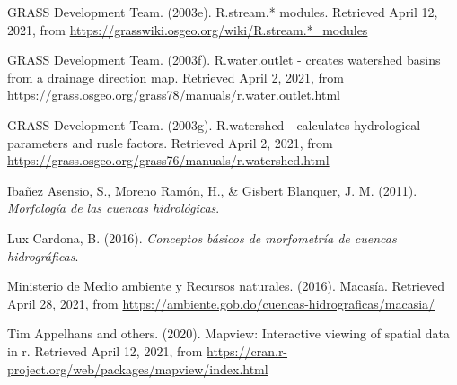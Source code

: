 \documentclass[11pt,]{article}
\begin{document}
\hypertarget{ref-addonrstream}{}
GRASS Development Team. (2003e). R.stream.* modules. Retrieved April 12,
2021, from \url{https://grasswiki.osgeo.org/wiki/R.stream.*_modules}

\hypertarget{ref-addonrwateroutlet}{}
GRASS Development Team. (2003f). R.water.outlet - creates watershed
basins from a drainage direction map. Retrieved April 2, 2021, from
\url{https://grass.osgeo.org/grass78/manuals/r.water.outlet.html}

\hypertarget{ref-addonrwater}{}
GRASS Development Team. (2003g). R.watershed - calculates hydrological
parameters and rusle factors. Retrieved April 2, 2021, from
\url{https://grass.osgeo.org/grass76/manuals/r.watershed.html}

\hypertarget{ref-ibanez2011morfologia}{}
Ibañez Asensio, S., Moreno Ramón, H., \& Gisbert Blanquer, J. M. (2011).
\emph{Morfología de las cuencas hidrológicas}.

\hypertarget{ref-lux2016conceptos}{}
Lux Cardona, B. (2016). \emph{Conceptos básicos de morfometría de
cuencas hidrográficas}.

\hypertarget{ref-MedioAmbiente}{}
Ministerio de Medio ambiente y Recursos naturales. (2016). Macasía.
Retrieved April 28, 2021, from
\url{https://ambiente.gob.do/cuencas-hidrograficas/macasia/}

\hypertarget{ref-mapview}{}
Tim Appelhans and others. (2020). Mapview: Interactive viewing of
spatial data in r. Retrieved April 12, 2021, from
\url{https://cran.r-project.org/web/packages/mapview/index.html}




\newpage
\singlespacing 
\end{document}
